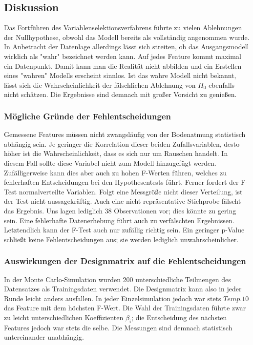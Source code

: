 \subsection{Diskussion}
Das Fortführen des Variablenselektionsverfahrens führte zu vielen Ablehnungen der Nullhypothese, obwohl das Modell bereits als vollständig angenommen wurde.
In Anbetracht der Datenlage allerdings lässt sich streiten, ob das Ausgangsmodell wirklich als "wahr" bezeichnet werden kann.
Auf jedes Feature kommt maximal ein Datenpunkt.
Damit kann man die Realität nicht abbilden und ein Erstellen eines "wahren" Modells erscheint sinnlos.
Ist das wahre Modell nicht bekannt, lässt sich die Wahrscheinlichkeit der fälschlichen Ablehnung von $H_0$ ebenfalls nicht schätzen.
Die Ergebnisse sind demnach mit großer Vorsicht zu genießen.

\subsubsection{Mögliche Gründe der Fehlentscheidungen}
Gemessene Features müssen nicht zwangsläufig von der Bodenatmung statistisch abhängig sein.
Je geringer die Korrelation dieser beiden Zufallsvariablen, desto höher ist die Wahrscheinlichkeit, dass es sich nur um Rauschen handelt.
In diesem Fall sollte diese Variabel nicht zum Modell hinzugefügt werden.
Zufälligerweise kann dies aber auch zu hohen F-Werten führen, welches zu fehlerhaften Entscheidungen bei den Hypothesentests führt.
Ferner fordert der F-Test normalverteilte Variablen.
Folgt eine Messgröße nicht dieser Verteilung, ist der Test nicht aussagekräftig.
Auch eine nicht repräsentative Stichprobe fälscht das Ergebnis.
Uns lagen lediglich 38 Observationen vor; dies könnte zu gering sein.
Eine fehlerhafte Datenerhebung führt auch zu verfälschten Ergebnissen.
Letztendlich kann der F-Test auch nur zufällig richtig sein.
Ein geringer p-Value schließt keine Fehlentscheidungen aus; sie werden lediglich unwahrscheinlicher.

\subsubsection{Auswirkungen der Designmatrix auf die Fehlentscheidungen}
In der Monte Carlo-Simulation wurden 200 unterschiedliche Teilmengen des Datensatzes als Trainingsdaten verwendet.
Die Designmatrix kann also in jeder Runde leicht anders ausfallen.
In jeder Einzelsimulation jedoch war stets $Temp.10$ das Feature mit dem höchsten F-Wert.
Die Wahl der Trainingsdaten führte zwar zu leicht unterschiedlichen Koeffizienten $\beta_i$; die Entscheidung des nächsten Features jedoch war stets die selbe.
Die Messungen sind demnach statistisch untereinander unabhängig.

